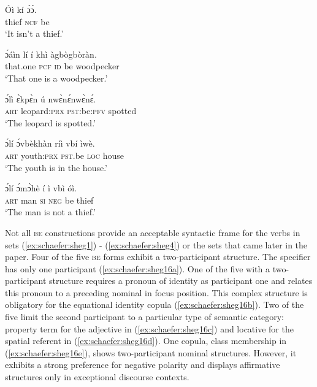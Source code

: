 \documentclass[output=paper,colorlinks,citecolor=brown
]{langscibook}
\begin{document}
  \ea \label{ex:schaefer:sheg16}
\begin{xlist}
\ex \label{ex:schaefer:sheg16a}
    \gll Óì kí ɔ́ɔ̀. \\
        thief \textsc{ncf} be\\
           \glt ‘It isn't a thief.’

\ex \label{ex:schaefer:sheg16b}
    \gll ɔ́áìn lí í khì àgbògbòràn. \\
        that.one \textsc{pcf} \textsc{id} be woodpecker \\
           \glt ‘That one is a woodpecker.’

\ex \label{ex:schaefer:sheg16c}
    \gll ɔ́lì ɛ̀kpɛ̀n ú nwɛ̀nɛ́nwɛ̀nɛ́. \\
        \textsc{art} {leopard:\textsc{prx}} {\textsc{pst}:be:\textsc{pfv}} spotted \\
           \glt ‘The leopard is spotted.’

\ex \label{ex:schaefer:sheg16d}
    \gll ɔ́lí ɔ́vbèkhàn ríì vbí ìwè. \\
        \textsc{art} {youth:\textsc{prx}} {\textsc{pst}.be} \textsc{loc} house \\
           \glt ‘The youth is in the house.’

\ex \label{ex:schaefer:sheg16e}
    \gll ɔ́lí ɔ́mɔ̀hè í ì vbì óì. \\
        \textsc{art} man \textsc{si} \textsc{neg} be thief \\
           \glt ‘The man is not a thief.’
           
\end{xlist}
\z	

Not all \textsc{be} constructions provide an acceptable syntactic frame for the verbs in sets (\ref{ex:schaefer:sheg1}) - (\ref{ex:schaefer:sheg4}) or the sets that came later in the paper. Four of the five \textsc{be} forms exhibit a two-participant structure. The specifier has only one participant (\ref{ex:schaefer:sheg16a}). One of the five with a two-participant structure requires a pronoun of identity as participant one and relates this pronoun to a preceding nominal in focus position. This complex structure is obligatory for the equational identity copula (\ref{ex:schaefer:sheg16b}). Two of the five limit the second participant to a particular type of semantic category: property term for the adjective in (\ref{ex:schaefer:sheg16c}) and locative for the spatial referent in (\ref{ex:schaefer:sheg16d}). One copula, class membership in (\ref{ex:schaefer:sheg16e}), shows two-participant nominal structures. However, it exhibits a strong preference for negative polarity and displays affirmative structures only in exceptional discourse contexts.  
\end{document}
